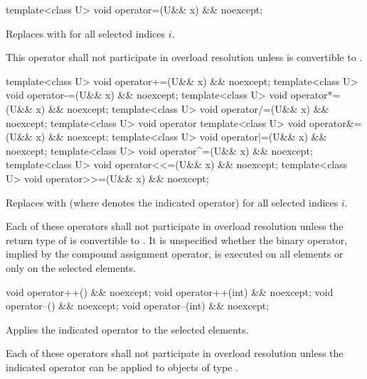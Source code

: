 \begin{itemdecl}
template<class U> void operator=(U&& x) && noexcept;
\end{itemdecl}

\begin{itemdescr}
  \pnum\effects
  Replaces  with  for all selected indices $i$.

  \pnum\remarks
  This operator shall not participate in overload resolution unless  is convertible to .
\end{itemdescr}

\begin{itemdecl}
template<class U> void operator+=(U&& x) && noexcept;
template<class U> void operator-=(U&& x) && noexcept;
template<class U> void operator*=(U&& x) && noexcept;
template<class U> void operator/=(U&& x) && noexcept;
template<class U> void operator%
template<class U> void operator&=(U&& x) && noexcept;
template<class U> void operator|=(U&& x) && noexcept;
template<class U> void operator^=(U&& x) && noexcept;
template<class U> void operator<<=(U&& x) && noexcept;
template<class U> void operator>>=(U&& x) && noexcept;
\end{itemdecl}

\begin{itemdescr}
  \pnum\effects
  Replaces  with  (where  denotes the indicated operator) for all selected indices $i$.

  \pnum\remarks
  Each of these operators shall not participate in overload resolution unless the return type of  is convertible to . It is unspecified whether the binary operator, implied by the compound assignment operator, is executed on all elements or only on the selected elements.
\end{itemdescr}

\begin{itemdecl}
void operator++() && noexcept;
void operator++(int) && noexcept;
void operator--() && noexcept;
void operator--(int) && noexcept;
\end{itemdecl}

\begin{itemdescr}
  \pnum\effects
  Applies the indicated operator to the selected elements.

  \pnum\remarks
  Each of these operators shall not participate in overload resolution unless the indicated operator can be applied to objects of type .
\end{itemdescr}

